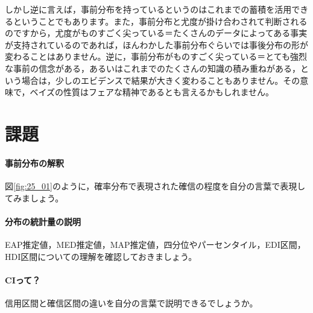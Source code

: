 \documentclass{ltjsbook}
\begin{document}
しかし逆に言えば，事前分布を持っているというのはこれまでの蓄積を活用できるということでもあります。また，事前分布と尤度が掛け合わされて判断されるのですから，尤度がものすごく尖っている＝たくさんのデータによってある事実が支持されているのであれば，ほんわかした事前分布ぐらいでは事後分布の形が変わることはありません。逆に，事前分布がものすごく尖っている＝とても強烈な事前の信念がある，あるいはこれまでのたくさんの知識の積み重ねがある，という場合は，少しのエビデンスで結果が大きく変わることもありません。その意味で，ベイズの性質はフェアな精神であるとも言えるかもしれません。


\section{課題}
\paragraph{事前分布の解釈}図\ref{fig:25_01}のように，確率分布で表現された確信の程度を自分の言葉で表現してみましょう。
\paragraph{分布の統計量の説明}EAP推定値，MED推定値，MAP推定値，四分位やパーセンタイル，EDI区間，HDI区間についての理解を確認しておきましょう。
\paragraph{CIって？}信用区間と確信区間の違いを自分の言葉で説明できるでしょうか。
\end{document}
